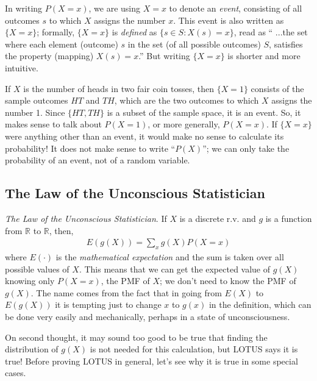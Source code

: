 In writing \(P(X = x)\), 
we are using \(X = x\) to denote an \emph{event}, 
consisting of all outcomes \(s\) to which \(X\) assigns the number \(x\). 
This event is also written as \(\{ X = x\}\);
formally, \(\{ X = x\}\) is \emph{defined} as \(\{s \in S: X(s) = x\}\), 
read as `` ...the set where each element (outcome) \(s\) in the set (of all possible outcomes) \(S\), 
satisfies the property (mapping) \(X(s) = x\).'' 
But writing \(\{ X = x\}\) is shorter and more intuitive. 

If \(X\) is the number of heads in two fair coin tosses, 
then \(\{ X = 1\}\) consists of the sample outcomes \(HT\) and \(TH\), 
which are the two outcomes to which \(X\) assigns the number 1. 
Since \(\{HT, TH\}\) is a subset of the sample space, 
it is an event. 
So, it makes sense to talk about \(P(X = 1)\), 
or more generally, \(P(X = x)\). 
If \(\{ X = x\}\) were anything other than an event, 
it would make no sense to calculate its probability! 
It does not make sense to write ``\(P(X)\)''; 
we can only take the probability of an event, 
not of a random variable.

\subsection{The Law of the Unconscious Statistician}

\emph{The Law of the Unconscious Statistician}. 
If \(X\) is a discrete r.v. and \(g\) is a function from \(\mathbb{R}\) to \(\mathbb{R}\), then,
\begin{align}
E(g(X)) = \sum_{x}{g(X)}P(X = x)
\end{align}
where \(E(\cdot)\) is the \emph{mathematical expectation} and­ the sum is
taken over all possible values of \(X\).
This means that we can get the expected value of \(g(X)\) knowing only \(P(X = x)\), 
the PMF of \(X\); 
we don't need to know the PMF of \(g(X)\). 
The name comes from the fact that in going from \(E(X)\) to
\(E(g(X))\) it is tempting just to change \(x\) to \(g(x)\) in the definition, 
which can be done very easily and mechanically, 
perhaps in a state of unconsciousness.

On second thought, 
it may sound too good to be true that finding the 
distribution of \(g(X)\) is not needed for this calculation, 
but LOTUS says it is true! 
Before proving LOTUS in general, 
let's see why it is true in some special cases.

